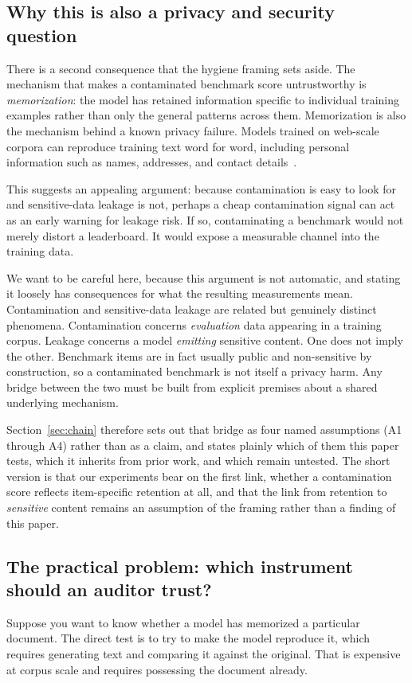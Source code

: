 \subsection{Why this is also a privacy and security question}
There is a second consequence that the hygiene framing sets aside. The mechanism that
makes a contaminated benchmark score untrustworthy is \emph{memorization}: the model has
retained information specific to individual training examples rather than only the
general patterns across them. Memorization is also the mechanism behind a known privacy
failure. Models trained on web-scale corpora can reproduce training text word for word,
including personal information such as names, addresses, and contact
details~\citep{carlini2021extracting,carlini2023quantifying}.

This suggests an appealing argument: because contamination is easy to look for and
sensitive-data leakage is not, perhaps a cheap contamination signal can act as an early
warning for leakage risk. If so, contaminating a benchmark would not merely distort a
leaderboard. It would expose a measurable channel into the training data.

We want to be careful here, because this argument is not automatic, and stating it
loosely has consequences for what the resulting measurements mean. Contamination and
sensitive-data leakage are related but genuinely distinct phenomena. Contamination
concerns \emph{evaluation} data appearing in a training corpus. Leakage concerns a model
\emph{emitting} sensitive content. One does not imply the other. Benchmark items are in
fact usually public and non-sensitive by construction, so a contaminated benchmark is
not itself a privacy harm. Any bridge between the two must be built from explicit
premises about a shared underlying mechanism.

Section~\ref{sec:chain} therefore sets out that bridge as four named assumptions
(A1 through A4) rather than as a claim, and states plainly which of them this paper
tests, which it inherits from prior work, and which remain untested. The short version
is that our experiments bear on the first link, whether a contamination score reflects
item-specific retention at all, and that the link from retention to \emph{sensitive}
content remains an assumption of the framing rather than a finding of this paper.

\subsection{The practical problem: which instrument should an auditor trust?}
Suppose you want to know whether a model has memorized a particular document. The
direct test is to try to make the model reproduce it, which requires generating text and
comparing it against the original. That is expensive at corpus scale and requires
possessing the document already.

